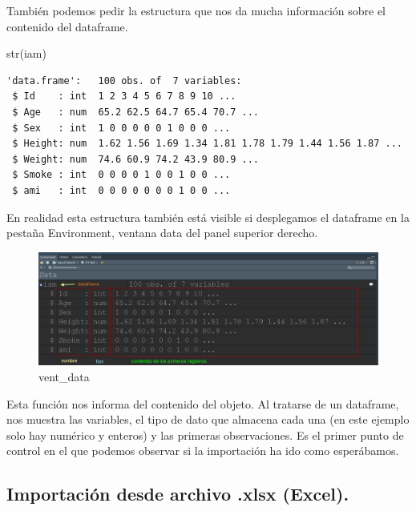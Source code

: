 \documentclass[
  letterpaper,
  DIV=11,
  numbers=noendperiod]{scrreprt}
\newenvironment{Shaded}{\begin{snugshade}}{\end{snugshade}}
\newcommand{\FunctionTok}[1]{\textcolor[rgb]{0.28,0.35,0.67}{#1}}
\newcommand{\NormalTok}[1]{\textcolor[rgb]{0.00,0.23,0.31}{#1}}
\begin{document}
También podemos pedir la estructura que nos da mucha información sobre
el contenido del dataframe.

\begin{Shaded}
\begin{Highlighting}[]
\FunctionTok{str}\NormalTok{(iam)}
\end{Highlighting}
\end{Shaded}

\begin{verbatim}
'data.frame':   100 obs. of  7 variables:
 $ Id    : int  1 2 3 4 5 6 7 8 9 10 ...
 $ Age   : num  65.2 62.5 64.7 65.4 70.7 ...
 $ Sex   : int  1 0 0 0 0 0 1 0 0 0 ...
 $ Height: num  1.62 1.56 1.69 1.34 1.81 1.78 1.79 1.44 1.56 1.87 ...
 $ Weight: num  74.6 60.9 74.2 43.9 80.9 ...
 $ Smoke : int  0 0 0 0 1 0 0 1 0 0 ...
 $ ami   : int  0 0 0 0 0 0 0 1 0 0 ...
\end{verbatim}

En realidad esta estructura también está visible si desplegamos el
dataframe en la pestaña Environment, ventana data del panel superior
derecho.

\begin{figure}

{\centering \includegraphics{./pics/iam_en_vent_data.png}

}

\caption{vent\_data}

\end{figure}

Esta función nos informa del contenido del objeto. Al tratarse de un
dataframe, nos muestra las variables, el tipo de dato que almacena cada
una (en este ejemplo solo hay numérico y enteros) y las primeras
observaciones. Es el primer punto de control en el que podemos observar
si la importación ha ido como esperábamos.

\hypertarget{importaciuxf3n-desde-archivo-.xlsx-excel.}{%
\subsection{Importación desde archivo .xlsx
(Excel).}\label{importaciuxf3n-desde-archivo-.xlsx-excel.}}
\end{document}
